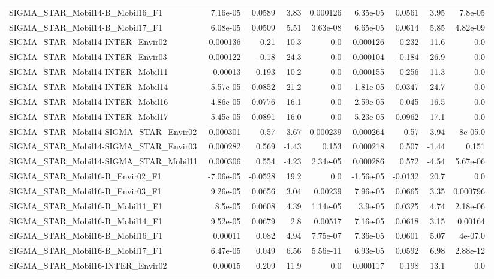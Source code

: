 \begin{tabular}{lrrrrrrrr}
SIGMA_STAR_Mobil14-B_Mobil16_F1 & 7.16e-05 & 0.0589 & 3.83 & 0.000126 & 6.35e-05 & 0.0561 & 3.95 & 7.8e-05 \\
SIGMA_STAR_Mobil14-B_Mobil17_F1 & 6.08e-05 & 0.0509 & 5.51 & 3.63e-08 & 6.65e-05 & 0.0614 & 5.85 & 4.82e-09 \\
SIGMA_STAR_Mobil14-INTER_Envir02 & 0.000136 & 0.21 & 10.3 & 0.0 & 0.000126 & 0.232 & 11.6 & 0.0 \\
SIGMA_STAR_Mobil14-INTER_Envir03 & -0.000122 & -0.18 & 24.3 & 0.0 & -0.000104 & -0.184 & 26.9 & 0.0 \\
SIGMA_STAR_Mobil14-INTER_Mobil11 & 0.00013 & 0.193 & 10.2 & 0.0 & 0.000155 & 0.256 & 11.3 & 0.0 \\
SIGMA_STAR_Mobil14-INTER_Mobil14 & -5.57e-05 & -0.0852 & 21.2 & 0.0 & -1.81e-05 & -0.0347 & 24.7 & 0.0 \\
SIGMA_STAR_Mobil14-INTER_Mobil16 & 4.86e-05 & 0.0776 & 16.1 & 0.0 & 2.59e-05 & 0.045 & 16.5 & 0.0 \\
SIGMA_STAR_Mobil14-INTER_Mobil17 & 5.45e-05 & 0.0891 & 16.0 & 0.0 & 5.23e-05 & 0.0962 & 17.1 & 0.0 \\
SIGMA_STAR_Mobil14-SIGMA_STAR_Envir02 & 0.000301 & 0.57 & -3.67 & 0.000239 & 0.000264 & 0.57 & -3.94 & 8e-05.0 \\
SIGMA_STAR_Mobil14-SIGMA_STAR_Envir03 & 0.000282 & 0.569 & -1.43 & 0.153 & 0.000218 & 0.507 & -1.44 & 0.151 \\
SIGMA_STAR_Mobil14-SIGMA_STAR_Mobil11 & 0.000306 & 0.554 & -4.23 & 2.34e-05 & 0.000286 & 0.572 & -4.54 & 5.67e-06 \\
SIGMA_STAR_Mobil16-B_Envir02_F1 & -7.06e-05 & -0.0528 & 19.2 & 0.0 & -1.56e-05 & -0.0132 & 20.7 & 0.0 \\
SIGMA_STAR_Mobil16-B_Envir03_F1 & 9.26e-05 & 0.0656 & 3.04 & 0.00239 & 7.96e-05 & 0.0665 & 3.35 & 0.000796 \\
SIGMA_STAR_Mobil16-B_Mobil11_F1 & 8.5e-05 & 0.0608 & 4.39 & 1.14e-05 & 3.9e-05 & 0.0325 & 4.74 & 2.18e-06 \\
SIGMA_STAR_Mobil16-B_Mobil14_F1 & 9.52e-05 & 0.0679 & 2.8 & 0.00517 & 7.16e-05 & 0.0618 & 3.15 & 0.00164 \\
SIGMA_STAR_Mobil16-B_Mobil16_F1 & 0.00011 & 0.082 & 4.94 & 7.75e-07 & 7.36e-05 & 0.0601 & 5.07 & 4e-07.0 \\
SIGMA_STAR_Mobil16-B_Mobil17_F1 & 6.47e-05 & 0.049 & 6.56 & 5.56e-11 & 6.93e-05 & 0.0592 & 6.98 & 2.88e-12 \\
SIGMA_STAR_Mobil16-INTER_Envir02 & 0.00015 & 0.209 & 11.9 & 0.0 & 0.000117 & 0.198 & 13.1 & 0.0 \\

\end{tabular}
